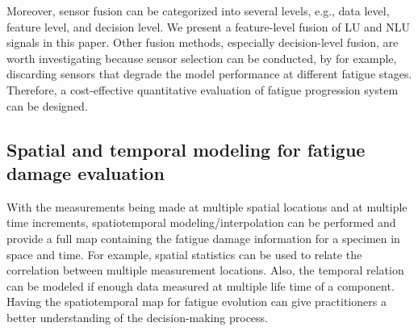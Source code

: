Moreover, sensor fusion can be categorized into several levels, e.g., data level, feature level, and decision level. We present a feature-level fusion of LU and NLU signals in this paper. Other fusion methods, especially decision-level fusion, are worth investigating because sensor selection can be conducted, by for example, discarding sensors that degrade the model performance at different fatigue stages. Therefore, a cost-effective quantitative evaluation of fatigue progression system can be designed.

\subsection{Spatial and temporal modeling for fatigue damage evaluation}

With the measurements being made at multiple spatial locations and at multiple time increments, spatiotemporal modeling/interpolation can be performed and provide a full map containing the fatigue damage information for a specimen in space and time. For example, spatial statistics can be used to relate the correlation between multiple measurement locations. Also, the temporal relation can be modeled if enough data measured at multiple life time of a component. Having the spatiotemporal map for fatigue evolution can give practitioners a better understanding of the decision-making process.
